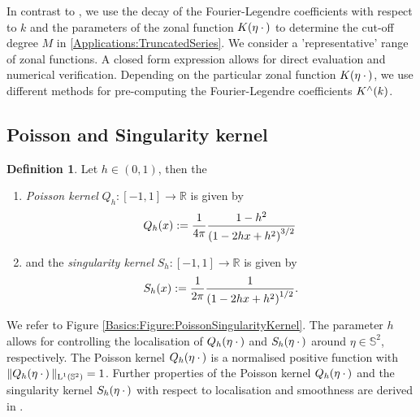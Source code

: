 \documentclass[11pt,a4paper,twoside,bibtotoc]{scrartcl}
\theoremstyle{plain}
\theoremstyle{definition}
\newtheorem{definition}[theorem]{Definition}
\theoremstyle{remark}
\newcommand{\R}{\ensuremath{\mathbb{R}}}
\newcommand{\Ln}[2]{\ensuremath{\text{\rm{L}}^{#1}\left(#2\right)}}
\newcommand{\fun}[2]{\ensuremath{#1{\hspace{-0.4ex}}\left(#2\right)}}
\numberwithin{equation}{section}
\numberwithin{table}{section}
\numberwithin{figure}{section}
\begin{document}
In contrast to \cite{Sc97,bahu01,CaFi}, we use the decay of the
Fourier-Legendre coefficients with respect to $k$ and the parameters of the
zonal function $\fun{K}{\mathbf{\eta} \: \cdot \,}$ to determine the cut-off degree
$M$ in \eqref{Applications:TruncatedSeries}.
We consider a 'representative' range of zonal functions. A closed form expression
allows for direct evaluation and numerical verification. Depending on the 
particular zonal function $\fun{K}{\mathbf{\eta} \: \cdot \,}$, we use different 
methods for pre-computing the Fourier-Legendre coefficients $\fun{K^{\wedge}}{k}$.

\pagebreak

\subsection{Poisson and Singularity kernel}
\begin{definition}\label{def:poisson_sing}
  Let $h \in (0,1)$, then the
  \begin{enumerate}
  \item \emph{Poisson kernel}
    $Q_{h}:[-1,1] \rightarrow \R$ is given by
    \[
    \fun{Q_{h}}{x} := \frac{1}{4\pi} \frac{1-h^2}{\left(1-2 h x+h^2\right)^{3/2}}\,
    \]
  \item and the \emph{singularity kernel}
    $S_{h}:[-1,1] \rightarrow \R$ is given by
    \[
    \fun{S_{h}}{x} := \frac{1}{2\pi} \frac{1}{\left(1-2 h x +h^2\right)^{1/2}}.
    \]
  \end{enumerate}
\end{definition}

We refer to Figure \ref{Basics:Figure:PoissonSingularityKernel}. The parameter 
$h$ allows for controlling the localisation of 
$\fun{Q_{h}}{\mathbf{\eta} \: \cdot \,}$ and $\fun{S_{h}}{\mathbf{\eta} \: \cdot \,}$ 
around $\eta \in \mathbb{S}^2$, respectively.
The Poisson kernel $\fun{Q_{h}}{\mathbf{\eta} \: \cdot \,}$ is a normalised positive function with
$\|\fun{Q_{h}}{\mathbf{\eta} \: \cdot \,}\|_{\Ln{1}{\mathbb{S}^2}}=1$.
Further properties of the Poisson kernel $\fun{Q_{h}}{\mathbf{\eta} \: \cdot \,}$ and the 
singularity kernel $\fun{S_{h}}{\mathbf{\eta} \: \cdot \,}$
with respect to localisation and smoothness are derived
in \cite[pp. 112]{frgesc}.
\end{document}
